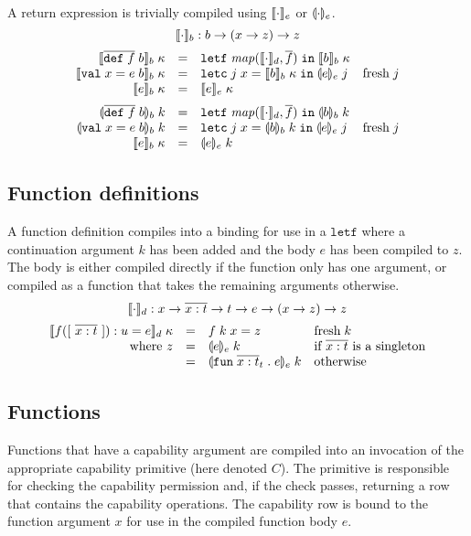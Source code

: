 \documentclass[11pt]{article}
\newcommand{\kw}[1]{\mathtt{#1}}
\begin{document}
A return expression is trivially compiled using $\llbracket \cdot \rrbracket_e$ or $\llparenthesis \cdot \rrparenthesis_e$.
\[
    \llbracket \cdot \rrbracket_b : b -> (x -> z) -> z
\]
\[
\begin{array}{rcll}
\cmpk{b}{\fundef{f}{b}} & = &
  \letff{\map{\cmpn{d}}{\repo{f}}}{\cmpk{b}{b}} \\
\cmpk{b}{\valdef{x}{e}{b}} & = &
  \letc{j}{x}{\cmpk{b}{b}}{\tcmpin{e}{e}{j}} & \fresh{j} \\
\cmpk{b}{\return{e}} & = &
  \cmpk{e}{e} \medskip \\

\tcmpk{b}{\fundef{f}{b}} & = &
  \letff{\map{\cmpn{d}}{\repo{f}}}{\tcmpk{b}{b}} \\
\tcmpk{b}{\valdef{x}{e}{b}} & = &
  \letc{j}{x}{\tcmpk{b}{b}}{\tcmpin{e}{e}{j}} & \fresh{j} \\
\cmpk{b}{\return{e}} & = &
  \tcmpk{e}{e} \\
\end{array}
\]

\subsection*{Function definitions}

A function definition compiles into a binding for use in a $\kw{letf}$ where a continuation argument $k$ has been added and the body $e$ has been compiled to $z$.
The body is either compiled directly if the function only has one argument, or compiled as a function that takes the remaining arguments otherwise.
\[
    \llbracket \cdot \rrbracket_d : x -> \overline{x : t} -> t -> e -> (x -> z) -> z
\]
\[
\begin{array}{rcll}
\cmpk{d}{\fd{f}{x}{t}{u}{e}} & = &
  \defterm{f}{k}{x}{z} &
  \fresh{k} \\
\text{where $z$} & = &
  \tcmpk{e}{e} & \text{if $\repo{\arge{x}{t}}$ is a singleton} \\
 & = &
  \tcmpk{e}{\fune{\repo{\arge{x}{t}}_t}{e}} & \text{otherwise} \\
\end{array}
\]

\subsection*{Functions}

Functions that have a capability argument are compiled into an invocation of the appropriate capability primitive (here denoted $C$).
The primitive is responsible for checking the capability permission and, if the check passes, returning a row that contains the capability operations.
The capability row is bound to the function argument $x$ for use in the compiled function body $e$.
\end{document}
